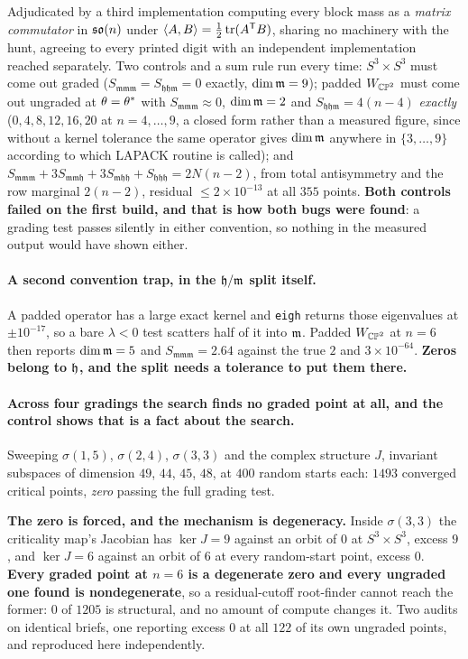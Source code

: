 \begin{certificate}
Adjudicated by a third implementation computing every block mass as a \emph{matrix commutator} in $\mathfrak{so}(n)$ under $\langle A,B\rangle=\tfrac12\operatorname{tr}(A^{\mathsf T}B)$, sharing no machinery with the hunt, agreeing to every printed digit with an independent implementation reached separately. Two controls and a sum rule run every time: $S^3\times S^3$ must come out graded ($S_{\mathfrak{mmm}}=S_{\mathfrak{hhm}}=0$ exactly, $\dim\mathfrak{m}=9$); padded $W_{\mathbb{CP}^2}$ must come out ungraded at $\theta=\theta^{*}$ with $S_{\mathfrak{mmm}}\approx0$, $\dim\mathfrak{m}=2$ and $S_{\mathfrak{hhm}}=4(n-4)$ \emph{exactly} ($0,4,8,12,16,20$ at $n=4,\dots,9$, a closed form rather than a measured figure, since without a kernel tolerance the same operator gives $\dim\mathfrak{m}$ anywhere in $\{3,\dots,9\}$ according to which LAPACK routine is called); and $S_{\mathfrak{mmm}}+3S_{\mathfrak{mmh}}+3S_{\mathfrak{mhh}}+S_{\mathfrak{hhh}}=2N(n-2)$, from total antisymmetry and the row marginal $2(n-2)$, residual $\le2\times10^{-13}$ at all $355$ points. \textbf{Both controls failed on the first build, and that is how both bugs were found}: a grading test passes silently in either convention, so nothing in the measured output would have shown either.
\end{certificate}

\paragraph{A second convention trap, in the $\mathfrak{h}/\mathfrak{m}$ split itself.} A padded operator has a large exact kernel and \texttt{eigh} returns those eigenvalues at $\pm10^{-17}$, so a bare $\lambda<0$ test scatters half of it into $\mathfrak{m}$. Padded $W_{\mathbb{CP}^2}$ at $n=6$ then reports $\dim\mathfrak{m}=5$ and $S_{\mathfrak{mmm}}=2.64$ against the true $2$ and $3\times10^{-64}$. \textbf{Zeros belong to $\mathfrak{h}$, and the split needs a tolerance to put them there.}

\paragraph{Across four gradings the search finds no graded point at all, and the control shows that is a fact about the search.} Sweeping $\sigma(1,5)$, $\sigma(2,4)$, $\sigma(3,3)$ and the complex structure $J$, invariant subspaces of dimension $49$, $44$, $45$, $48$, at $400$ random starts each: $1493$ converged critical points, \emph{zero} passing the full grading test.

\begin{certificate}
\textbf{The zero is forced, and the mechanism is degeneracy.} Inside $\sigma(3,3)$ the criticality map's Jacobian has $\ker J=9$ against an orbit of $0$ at $S^3\times S^3$, excess $9$, and $\ker J=6$ against an orbit of $6$ at every random-start point, excess $0$. \textbf{Every graded point at $n=6$ is a degenerate zero and every ungraded one found is nondegenerate}, so a residual-cutoff root-finder cannot reach the former: $0$ of $1205$ is structural, and no amount of compute changes it. Two audits on identical briefs, one reporting excess $0$ at all $122$ of its own ungraded points, and reproduced here independently.
\end{certificate}

